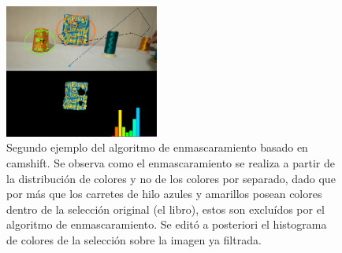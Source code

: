 \begin{figure}[H]
\centering
	\includegraphics[width=0.45\textwidth]{Imagenes/camshift_mask2.png}
	\caption{Segundo ejemplo del algoritmo de enmascaramiento basado en camshift. Se observa como el enmascaramiento se realiza a partir de la distribución de colores y no de los colores por separado, dado que por más que los carretes de hilo azules y amarillos posean colores dentro de la selección original (el libro), estos son excluídos por el algoritmo de enmascaramiento. Se editó a posteriori el histograma de colores de la selección sobre la imagen ya filtrada.}
	\label{fig:c_mask2}
\end{figure}




















































